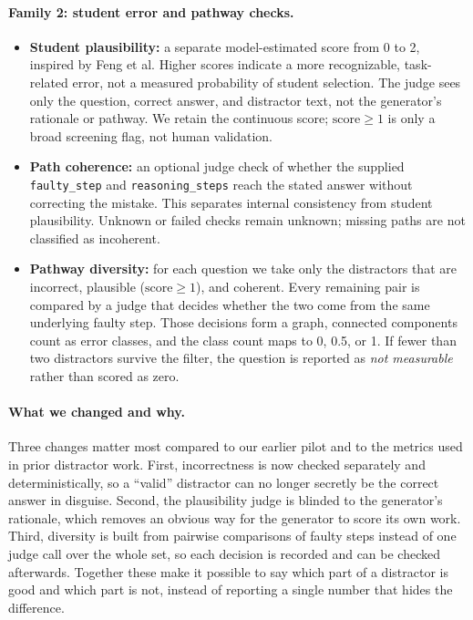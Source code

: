 \paragraph{Family 2: student error and pathway checks.}
\begin{itemize}
    \item \textbf{Student plausibility:} a separate model-estimated score from 0 to 2, inspired by Feng et al. Higher scores indicate a more recognizable, task-related error, not a measured probability of student selection. The judge sees only the question, correct answer, and distractor text, not the generator's rationale or pathway. We retain the continuous score; $\text{score} \geq 1$ is only a broad screening flag, not human validation.
    \item \textbf{Path coherence:} an optional judge check of whether the supplied \texttt{faulty\_step} and \texttt{reasoning\_steps} reach the stated answer without correcting the mistake. This separates internal consistency from student plausibility. Unknown or failed checks remain unknown; missing paths are not classified as incoherent.
    \item \textbf{Pathway diversity:} for each question we take only the distractors that are incorrect, plausible ($\text{score} \geq 1$), and coherent. Every remaining pair is compared by a judge that decides whether the two come from the same underlying faulty step. Those decisions form a graph, connected components count as error classes, and the class count maps to 0, 0.5, or 1. If fewer than two distractors survive the filter, the question is reported as \emph{not measurable} rather than scored as zero.
\end{itemize}

\paragraph{What we changed and why.} Three changes matter most compared to our earlier pilot and to the metrics used in prior distractor work. First, incorrectness is now checked separately and deterministically, so a ``valid'' distractor can no longer secretly be the correct answer in disguise. Second, the plausibility judge is blinded to the generator's rationale, which removes an obvious way for the generator to score its own work. Third, diversity is built from pairwise comparisons of faulty steps instead of one judge call over the whole set, so each decision is recorded and can be checked afterwards. Together these make it possible to say which part of a distractor is good and which part is not, instead of reporting a single number that hides the difference.

